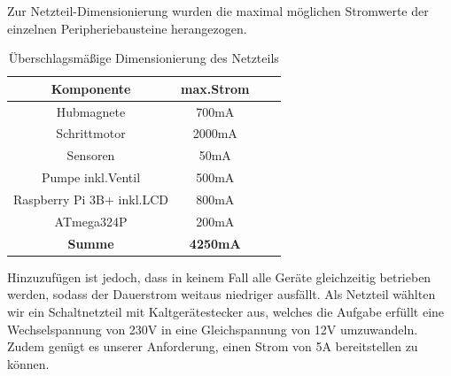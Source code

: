 Zur Netzteil-Dimensionierung wurden die maximal möglichen Stromwerte der einzelnen Peripheriebausteine herangezogen.

\begin{table}[h]
    \centering
    \begin{tabular}{|c|c|c|c|}
        \hline
        \textbf{Komponente} & \textbf{max.Strom} \\ \hline
        Hubmagnete & 700mA \\ \hline
        Schrittmotor & 2000mA \\ \hline
        Sensoren & 50mA \\ \hline
        Pumpe inkl.Ventil & 500mA \\ \hline
        Raspberry Pi 3B+ inkl.\acs{LCD} & 800mA \\ \hline
        ATmega324P & 200mA \\ \hline
        \textbf{Summe} & \textbf{4250mA} \\ \hline
    \end{tabular}
    \caption{Überschlagsmäßige Dimensionierung des Netzteils}
\end{table}

Hinzuzufügen ist jedoch, dass in keinem Fall alle Geräte gleichzeitig betrieben werden, sodass der Dauerstrom weitaus niedriger ausfällt.
Als Netzteil wählten wir ein Schaltnetzteil mit Kaltgerätestecker aus, welches die Aufgabe erfüllt eine Wechselspannung von 230V in eine Gleichspannung von 12V umzuwandeln.
Zudem genügt es unserer Anforderung, einen Strom von 5A bereitstellen zu können.

